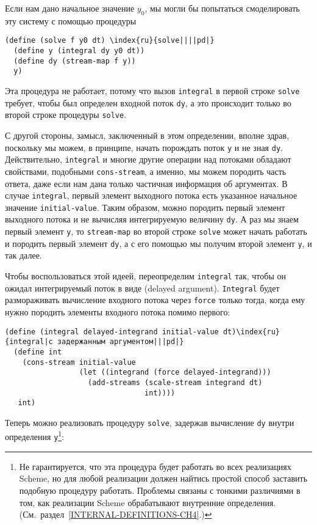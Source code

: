 Если нам дано начальное значение $y_0$, мы могли
бы попытаться смоделировать эту систему с помощью процедуры

\begin{Verbatim}[fontsize=\small]
(define (solve f y0 dt) \index{ru}{solve||||pd|}
  (define y (integral dy y0 dt))
  (define dy (stream-map f y))
  y)
\end{Verbatim}
Эта процедура не работает, потому что вызов {\tt integral} в
первой строке {\tt solve} требует, чтобы был определен входной
поток {\tt dy}, а это происходит только во второй строке
процедуры {\tt solve}.

С другой стороны, замысл, заключенный в этом
определении, вполне здрав, поскольку мы можем, в принципе, начать
порождать поток {\tt y} и не зная {\tt dy}.
Действительно, {\tt integral} и многие другие операции над
потоками обладают свойствами, подобными {\tt cons-stream}, а
именно, мы можем породить часть ответа, даже если нам дана только
частичная информация об аргументах.  В случае {\tt integral}, первый
элемент выходного потока есть указанное начальное значение
{\tt initial-value}.  Таким образом, можно породить первый
элемент выходного потока и не вычисляя интегрируемую величину
{\tt dy}.  А раз мы знаем первый элемент {\tt y}, то
{\tt stream-map} во второй строке {\tt solve} может
начать работать и породить первый элемент {\tt dy}, а с его
помощью мы получим второй элемент {\tt y}, и так далее.

Чтобы воспользоваться этой идеей, переопределим
{\tt integral} так, чтобы он ожидал интегрируемый поток в виде
 (delayed argument).
{\tt Integral} будет размораживать вычисление входного потока
через {\tt force} только тогда, когда ему нужно породить
элементы входного потока помимо первого:

\begin{Verbatim}[fontsize=\small]
(define (integral delayed-integrand initial-value dt)\index{ru}{integral|с задержанным аргументом|||pd|}
  (define int
    (cons-stream initial-value
                 (let ((integrand (force delayed-integrand)))
                   (add-streams (scale-stream integrand dt)
                                int))))
   int)
\end{Verbatim}
Теперь можно реализовать процедуру {\tt solve}, задержав
вычисление {\tt dy} внутри определения {\tt y}\footnote{Не гарантируется, что эта процедура будет работать во
всех реализациях Scheme, но для любой реализации должен найтись простой
способ заставить подобную процедуру работать.  Проблемы связаны с
тонкими различиями в том, как реализации Scheme обрабатывают
внутренние определения.
(См.~раздел~\ref{INTERNAL-DEFINITIONS-CH4}.)}:

